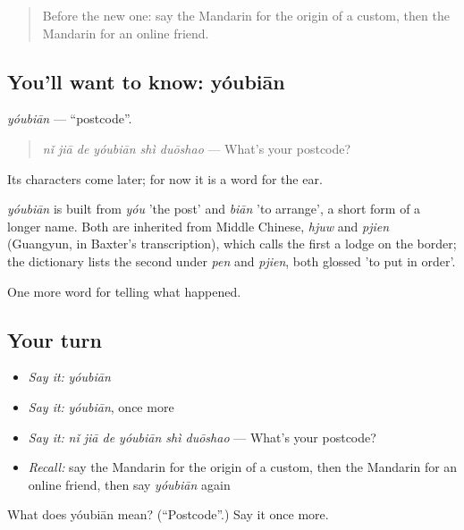 \label{lesson:ZH-C345-youbian}



\begin{quote}
Before the new one: say the Mandarin for the origin of a custom, then the Mandarin for an online friend.
\end{quote}

\subsection*{You'll want to know: yóubiān}
\emph{yóubiān} — \textquotedblleft{}postcode\textquotedblright{}.

\begin{quote}
\emph{nǐ jiā de yóubiān shì duōshao} — What's your postcode?
\end{quote}

Its characters come later; for now it is a word for the ear.

\begin{cousinweb}
\emph{yóubiān} is built from \emph{yóu} 'the post' and \emph{biān} 'to arrange', a short form of a longer name. Both are inherited from Middle Chinese, \emph{hjuw} and \emph{pjien} (Guangyun, in Baxter's transcription), which calls the first a lodge on the border; the dictionary lists the second under \emph{pen} and \emph{pjien}, both glossed 'to put in order'.
\end{cousinweb}

\begin{grammarlens}[title={What you've built}]
One more word for telling what happened.
\end{grammarlens}

\subsection*{Your turn}
\begin{itemize}
\raggedright
  \item \emph{Say it:} \emph{yóubiān}
  \item \emph{Say it:} \emph{yóubiān}, once more
  \item \emph{Say it:} \emph{nǐ jiā de yóubiān shì duōshao} — What's your postcode?
  \item \emph{Recall:} say the Mandarin for the origin of a custom, then the Mandarin for an online friend, then say \emph{yóubiān} again
\end{itemize}

\begin{tcolorbox}[breakable,colback=teal!4,colframe=teal!35!black,title={Before you move on}]
What does yóubiān mean? (\textquotedblleft{}Postcode\textquotedblright{}.) Say it once more.
\end{tcolorbox}
